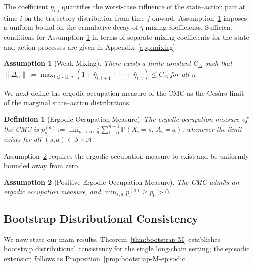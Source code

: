 \documentclass{article}
\numberwithin{equation}{section}
\newtheorem{definition}{Definition}
\newtheorem{assumption}{Assumption}
\begin{document}
The coefficient $\bar\eta_{i,j}$ quantifies the worst-case influence of the state--action pair at time $i$ on the trajectory distribution from time $j$ onward. Assumption~\ref{ass:eta-mix} imposes a uniform bound on the cumulative decay of $\bar\eta$-mixing coefficients. Sufficient conditions for Assumption~\ref{ass:eta-mix} in terms of separate mixing coefficients for the state and action processes are given in Appendix~\ref{app:mixing}.
\begin{assumption}[Weak Mixing]
\label{ass:eta-mix}
There exists a finite constant $C_\Delta$ such that $\|\Delta_n\| := \max_{1\le i\le n}(1+\bar\eta_{i,i+1}+\cdots+\bar\eta_{i,n}) \le C_\Delta$ for all $n$.
\end{assumption}
We next define the ergodic occupation measure of the CMC as the Cesàro limit of the marginal state--action distributions.
\begin{definition}[Ergodic Occupation Measure]
\label{def:semi-ergodic}
The ergodic occupation measure of the CMC is $p_s^{(a)} := \lim_{n\to\infty} \tfrac{1}{n}\sum_{i=0}^{n-1}\mathbb{P}(X_i=s,\,A_i=a)$, whenever the limit exists for all $(s,a)\in\mathcal{S}\times\mathcal{A}$.
\end{definition}
Assumption~\ref{ass:semi-ergodic} requires the ergodic occupation measure to exist and be uniformly bounded away from zero.
\begin{assumption}[Positive Ergodic Occupation Measure]
\label{ass:semi-ergodic}
The CMC admits an ergodic occupation measure, and $\min_{s,a} p_s^{(a)} \ge p_0 > 0$.
\end{assumption}
\subsection{Bootstrap Distributional Consistency}
\label{sec:bootstrap-consistency}

We now state our main results. Theorem~\ref{thm:bootstrap-M} establishes bootstrap distributional consistency for the single long-chain setting; the episodic extension follows as Proposition~\ref{prop:bootstrap-M-episodic}.
\end{document}
